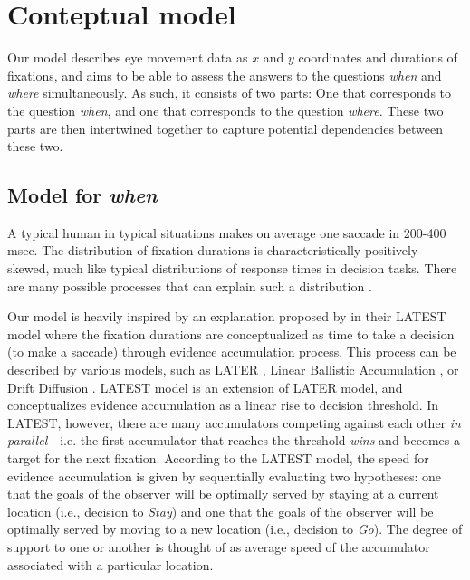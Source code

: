 \documentclass{article}
\begin{document}
\section{Conteptual model}

Our model describes eye movement data as $x$ and $y$ coordinates and durations of fixations, and aims to be able to assess the answers to the questions \textit{when} and \textit{where} simultaneously. As such, it consists of two parts: One that corresponds to the question \textit{when}, and one that corresponds to the question \textit{where}. These two parts are then intertwined together to capture potential dependencies between these two.


\subsection{Model for \textit{when}}

A typical human in typical situations makes on average one saccade in 200-400 msec. The distribution of fixation durations is characteristically positively skewed, much like typical distributions of response times in decision tasks. There are many possible processes that can explain such a distribution \citep{palmer2011shapes}. 

Our model is heavily inspired by an explanation proposed by \citet{tatler2017latest} in their LATEST model where the fixation durations are conceptualized as time to take a decision (to make a saccade) through evidence accumulation process. This process can be described by various models, such as LATER \citep{carpenter1995neural}, Linear Ballistic Accumulation \citep{brown2008simplest}, or Drift Diffusion \citep{ratcliff2008diffusion}. LATEST model is an extension of LATER model, and conceptualizes evidence accumulation as a linear rise to decision threshold. In LATEST, however, there are many accumulators competing against each other \textit{in parallel} - i.e. the first accumulator that reaches the threshold \textit{wins} and becomes a target for the next fixation. According to the LATEST model, the speed for evidence accumulation is given by sequentially evaluating two hypotheses: one that the goals of the observer will be optimally served by staying at a current location (i.e., decision to \textit{Stay}) and one that the goals of the observer will be optimally served by moving to a new location (i.e., decision to \textit{Go}). The degree of support to one or another is thought of as average speed of the accumulator associated with a particular location.
\end{document}
